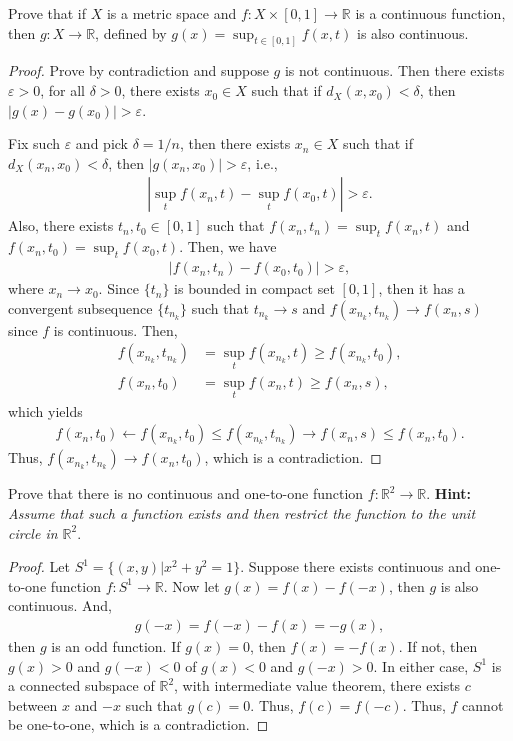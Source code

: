 \documentclass[11pt]{article}
\theoremstyle{definition}
\numberwithin{equation}{subsection}
\begin{document}
\medskip

Prove that if $X$ is a metric space and $f:X \times [0,1] \to \mathbb{R}$ is a continuous function, then $g:X \to \mathbb{R}$, defined by $g(x) = \sup_{t\in [0,1]}f(x,t)$ is also continuous. 
\begin{proof}
Prove by contradiction and suppose $g$ is not continuous. Then there exists $\varepsilon > 0$, for all $\delta > 0$, there exists $x_0 \in X$ such that if $d_X(x,x_0) < \delta$, then $|g(x) - g(x_0)| > \varepsilon$. 

Fix such $\varepsilon$ and pick $\delta = 1/n$, then there exists $x_n \in X$ such that if $d_X(x_n, x_0) < \delta$, then $|g(x_n, x_0)| > \varepsilon$, i.e., 
\begin{align*}
    \left|\sup_{t}f(x_n,t) - \sup_{t}f(x_0,t)\right| > \varepsilon.
\end{align*}
Also, there exists $t_n, t_0 \in [0,1]$ such that $f(x_n, t_n) = \sup_{t}f(x_n,t)$ and $f(x_n, t_0) = \sup_{t}f(x_0,t)$. Then, we have 
\begin{align*}
    \left|f(x_n,t_n) - f(x_0,t_0)\right| > \varepsilon,
\end{align*}
where $x_n \to x_0$. Since $\{t_n\}$ is bounded in compact set $[0,1]$, then it has a convergent subsequence $\{t_{n_k}\}$ such that $t_{n_k}\to s$ and $f(x_{n_k}, t_{n_k}) \to f(x_n, s)$ since $f$ is continuous. Then, 
\begin{align*}
    f\left(x_{n_k}, t_{n_k}\right) & = \sup_{t} f\left(x_{n_k}, t\right) \geq f\left(x_{n_k}, t_0\right), \\
    f\left(x_n, t_0\right) & = \sup_{t}f(x_n,t) \geq f(x_n, s),
\end{align*}
which yields
\begin{align*}
    f\left(x_n, t_0\right) \gets f\left(x_{n_k}, t_0\right) \leq f\left(x_{n_k}, t_{n_k}\right) \to f\left(x_n, s\right) \leq f\left(x_n, t_0\right).
\end{align*}
Thus, $f\left(x_{n_k}, t_{n_k}\right) \to f\left(x_n, t_0\right)$, which is a contradiction.
\end{proof}

\medskip

Prove that there is no continuous and one-to-one function $f:\mathbb{R}^2 \to \mathbb{R}$. \textbf{Hint:} \textit{Assume that such a function exists and then restrict the function to the unit circle in $\mathbb{R}^2$}.
\begin{proof}
Let $S^1 = \{(x,y)| x^2 + y^2 = 1\}$. Suppose there exists continuous and one-to-one function $f: S^1 \to \mathbb{R}$. Now let $g(x) = f(x) - f(-x)$, then $g$ is also continuous. And,
\begin{align*}
    g(-x) = f(-x) - f(x) = - g(x),
\end{align*}
then $g$ is an odd function. If $g(x) = 0$, then $f(x) = -f(x)$. If not, then $g(x) > 0$ and $g(-x) < 0$ of $g(x) < 0$ and $g(-x) > 0$. In either case, $S^1$ is a connected subspace of $\mathbb{R}^2$, with intermediate value theorem, there exists $c$ between $x$ and $-x$ such that $g(c) = 0$. Thus, $f(c) = f(-c)$. Thus, $f$ cannot be one-to-one, which is a contradiction\cite{2}.
\end{proof}
\end{document}
